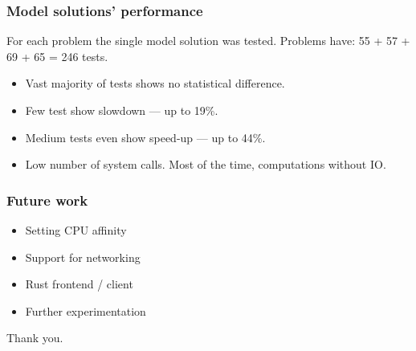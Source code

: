 \documentclass{beamer}
\begin{document}
\begin{frame}
    \frametitle{Model solutions' performance}
    For each problem the single model solution was tested. Problems have: 55 + 57 + 69 + 65 = 246 tests.
    \begin{itemize}
        \item \textcolor{green!70!black}{Vast majority of tests shows no statistical difference.}
        \item Few test show slowdown --- up to 19\%.
        \item Medium tests even show speed-up --- up to 44\%.
        \item Low number of system calls. Most of the time, computations without IO.
    \end{itemize}
\end{frame}

\begin{frame}
    \frametitle{Future work}
    \begin{itemize}
        \item Setting CPU affinity
        \item Support for networking
        \item Rust frontend / client
        \item Further experimentation
    \end{itemize}
\end{frame}

\begin{frame}
    \begin{center}
        Thank you.
    \end{center}
\end{frame}
\end{document}
